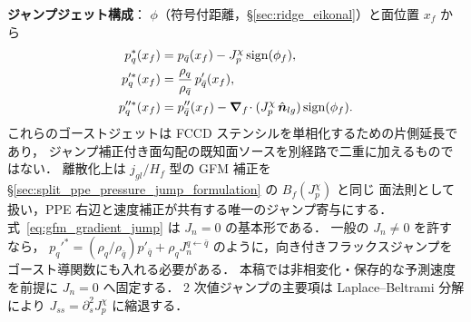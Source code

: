 \noindent\textbf{ジャンプジェット構成}：
$\phi$（符号付距離，\S\ref{sec:ridge_eikonal}）と面位置 $x_f$ から
\begin{align}
  p_q^\ast(x_f)
    &= p_{\bar q}(x_f) - J_p^\chi\,\mathrm{sign}(\phi_f),
      \label{eq:gfm_value_jump}\\
  p_q'^\ast(x_f)
    &= \frac{\rho_q}{\rho_{\bar q}}\,p'_{\bar q}(x_f),
      \label{eq:gfm_gradient_jump}\\
  p_q''^\ast(x_f)
    &= p''_{\bar q}(x_f)
       - \bm{\nabla}_f\!\cdot(J_p^\chi\,\hat{\bm n}_{lg})\,\mathrm{sign}(\phi_f).
      \label{eq:gfm_curvature_jump}
\end{align}
これらのゴーストジェットは FCCD ステンシルを単相化するための片側延長であり，
ジャンプ補正付き面勾配の既知面ソースを別経路で二重に加えるものではない．
離散化上は $j_{gl}/H_f$ 型の GFM 補正を
\S\ref{sec:split_ppe_pressure_jump_formulation} の $B_f(J_p^\chi)$ と同じ
面法則として扱い，PPE 右辺と速度補正が共有する唯一のジャンプ寄与にする．
式~\eqref{eq:gfm_gradient_jump} は $J_n=0$ の基本形である．
一般の $J_n\ne0$ を許すなら，
$p_q'^\ast=(\rho_q/\rho_{\bar q})p'_{\bar q}+\rho_q J_n^{q\leftarrow\bar q}$
のように，向き付きフラックスジャンプをゴースト導関数にも入れる必要がある．
本稿では非相変化・保存的な予測速度を前提に $J_n=0$ へ固定する．
2 次値ジャンプの主要項は Laplace--Beltrami 分解により
$J_{ss}=\partial_s^2 J_p^\chi$ に縮退する．

